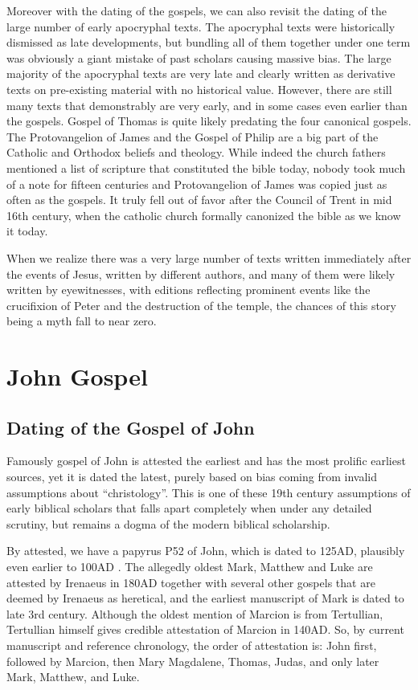 Moreover with the dating of the gospels, we can also revisit the dating of the large number of early apocryphal texts.
The apocryphal texts were historically dismissed as late developments, but bundling all of them together under one term was obviously a giant mistake of past scholars causing massive bias.
The large majority of the apocryphal texts are very late and clearly written as derivative texts on pre-existing material with no historical value.
However, there are still many texts that demonstrably are very early, and in some cases even earlier than the gospels.
Gospel of Thomas is quite likely predating the four canonical gospels.
The Protovangelion of James and the Gospel of Philip are a big part of the Catholic and Orthodox beliefs and theology.
While indeed the church fathers mentioned a list of scripture that constituted the bible today, nobody took much of a note for fifteen centuries and Protovangelion of James was copied just as often as the gospels.
It truly fell out of favor after the Council of Trent in mid 16th century, when the catholic church formally canonized the bible as we know it today.

When we realize there was a very large number of texts written immediately after the events of Jesus, written by different authors, and many of them were likely written by eyewitnesses, with editions reflecting prominent events like the crucifixion of Peter and the destruction of the temple, the chances of this story being a myth fall to near zero.

\section{John Gospel}\label{sec:john-gospel}

\subsection{Dating of the Gospel of John}\label{subsec:dating-of-the-gospel-of-john}

Famously gospel of John is attested the earliest and has the most prolific earliest sources, yet it is dated the latest, purely based on bias coming from invalid assumptions about ``christology''.
This is one of these 19th century assumptions of early biblical scholars that falls apart completely when under any detailed scrutiny, but remains a dogma of the modern biblical scholarship.

By attested, we have a papyrus P52 of John, which is dated to 125AD, plausibly even earlier to 100AD .
The allegedly oldest Mark, Matthew and Luke are attested by Irenaeus in 180AD together with several other gospels that are deemed by Irenaeus as heretical, and the earliest manuscript of Mark is dated to late 3rd century.
Although the oldest mention of Marcion is from Tertullian, Tertullian himself gives credible attestation of Marcion in 140AD.
So, by current manuscript and reference chronology, the order of attestation is: John first, followed by Marcion, then Mary Magdalene, Thomas, Judas, and only later Mark, Matthew, and Luke.


